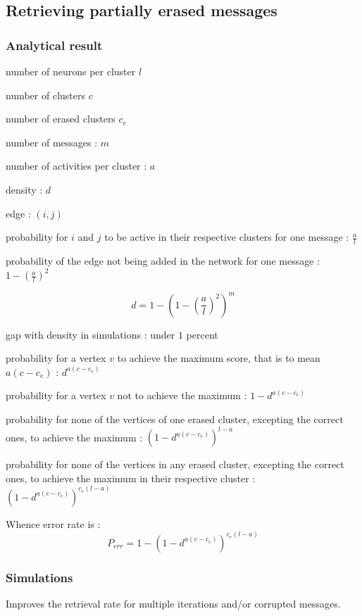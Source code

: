 \documentclass[english,11pt,twocolumn]{article}
\theoremstyle{definition}
\begin{document}
	\subsection{Retrieving partially erased messages}		
		
	\subsubsection{Analytical result}
		
	number of neurons per cluster $l$
	
	number of clusters $c$
	
	number of erased clusters $c_e$
	
	number of messages : $m$
	
	number of activities per cluster : $a$
	
	density : $d$

	edge : $(i, j)$
	
	probability for $i$ and $j$ to be active in their respective clusters for one message : $\frac{a}{l}$
	
	probability of the edge	not being added in the network for one message : $1 - \left(\frac{a}{l}\right)^2$
	
			
	\[ d = 1 - \left( 1 - \left(\frac{a}{l}\right)^2 \right)^m \]
	
	gap with density in simulations : under $1$ percent
	
	probability for a vertex $v$ to achieve the maximum score, that is to mean $a(c-c_e)$ : $d^	{a(c-c_e)}$
	
	probability for a vertex $v$	not to achieve the maximum : $1 - d^	{a(c-c_e)}$
	
	probability for none of the vertices of one erased cluster, excepting the correct ones, to achieve the maximum : $\left(1 - d^	{a(c-c_e)}\right)^{l-a}$
	
	probability for none of the vertices in any erased cluster, excepting the correct ones, to achieve the maximum in their respective cluster : $\left(1 - d^	{a(c-c_e)}\right)^{c_e(l-a)}$
	
	Whence error rate is : \[P_{err} = 1 -	\left(1 - d^	{a(c-c_e)}\right)^{c_e(l-a)} \]
	
	
	
	
	
	\subsubsection{Simulations}
		Improves the retrieval rate for multiple iterations and/or corrupted messages.
		
\end{document}
